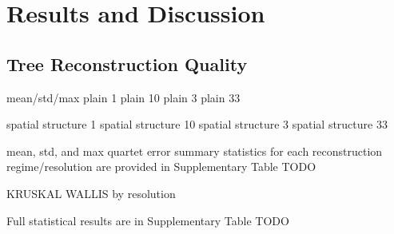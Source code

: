 \section{Results and Discussion} \label{sec:results}

\subsection{Tree Reconstruction Quality}



mean/std/max
plain	1%
plain	10%
plain	3%
plain	33%


spatial structure	1%
spatial structure	10%
spatial structure	3%
spatial structure	33%

mean, std, and max quartet error summary statistics for each reconstruction regime/resolution are provided in Supplementary Table TODO


KRUSKAL WALLIS by resolution
%
%
%

Full statistical results are in Supplementary Table TODO

